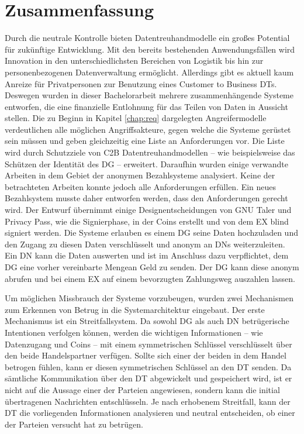 \documentclass[
	fontsize=11pt,
	headings=small,
	parskip=half,           %
	bibliography=totoc,
	numbers=noenddot,       %
	open=any,               %
]{scrreprt}
\begin{document}
\chapter{Zusammenfassung}
Durch die neutrale Kontrolle bieten Datentreuhandmodelle ein großes Potential für zukünftige Entwicklung. Mit den bereits bestehenden Anwendungsfällen wird Innovation in den unterschiedlichsten Bereichen von Logistik bis hin zur personenbezogenen Datenverwaltung ermöglicht. Allerdings gibt es aktuell kaum Anreize für Privatpersonen zur Benutzung eines Customer to Business DTs. Deswegen wurden in dieser Bachelorarbeit mehrere zusammenhängende Systeme entworfen, die eine finanzielle Entlohnung für das Teilen von Daten in Aussicht stellen. Die zu Beginn in Kapitel \ref{chap:req} dargelegten Angreifermodelle verdeutlichen alle möglichen Angriffsakteure, gegen welche die Systeme gerüstet sein müssen und geben gleichzeitig eine Liste an Anforderungen vor. Die Liste wird durch Schutzziele von C2B Datentreuhandmodellen -- wie beispielsweise das Schützen der Identität des DG -- erweitert. Daraufhin wurden einige verwandte Arbeiten in dem Gebiet der anonymen Bezahlsysteme analysiert. Keine der betrachteten Arbeiten konnte jedoch alle Anforderungen erfüllen. Ein neues Bezahlsystem musste daher entworfen werden, dass den Anforderungen gerecht wird. Der Entwurf übernimmt einige Designentscheidungen von GNU Taler und Privacy Pass, wie die Signierphase, in der Coins erstellt und von dem EX blind signiert werden. Die Systeme erlauben es einem DG seine Daten hochzuladen und den Zugang zu diesen Daten verschlüsselt und anonym an DNs weiterzuleiten. Ein DN kann die Daten auswerten und ist im Anschluss dazu verpflichtet, dem DG eine vorher vereinbarte Mengean Geld zu senden. Der DG kann diese anonym abrufen und bei einem EX auf einem bevorzugten Zahlungsweg auszahlen lassen.

Um möglichen Missbrauch der Systeme vorzubeugen, wurden zwei Mechanismen zum Erkennen von Betrug in die Systemarchitektur eingebaut. Der erste Mechanismus ist ein Streitfallsystem. Da sowohl DG als auch DN betrügerische Intentionen verfolgen können, werden die wichtigen Informationen -- wie Datenzugang und Coins -- mit einem symmetrischen Schlüssel verschlüsselt über den beide Handelspartner verfügen. Sollte sich einer der beiden in dem Handel betrogen fühlen, kann er diesen symmetrischen Schlüssel an den DT senden. Da sämtliche Kommunikation über den DT abgewickelt und gespeichert wird, ist er nicht auf die Aussage einer der Parteien angewiesen, sondern kann die initial übertragenen Nachrichten entschlüsseln. Je nach erhobenem Streitfall, kann der DT die vorliegenden Informationen analysieren und neutral entscheiden, ob einer der Parteien versucht hat zu betrügen.
\end{document}
